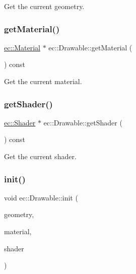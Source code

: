 Get the current geometry. \mbox{\label{classec_1_1_drawable_ac74210aca5428bedbf8af7abe9adbcc1}} 
\subsubsection{\texorpdfstring{get\+Material()}{getMaterial()}}
{\footnotesize\ttfamily \mbox{\hyperlink{classec_1_1_material}{ec\+::\+Material}} $\ast$ ec\+::\+Drawable\+::get\+Material (\begin{DoxyParamCaption}{ }\end{DoxyParamCaption}) const}

Get the current material. \mbox{\label{classec_1_1_drawable_a7de4c8aa937bda1009c6428ceeb541c1}} 
\subsubsection{\texorpdfstring{get\+Shader()}{getShader()}}
{\footnotesize\ttfamily \mbox{\hyperlink{classec_1_1_shader}{ec\+::\+Shader}} $\ast$ ec\+::\+Drawable\+::get\+Shader (\begin{DoxyParamCaption}{ }\end{DoxyParamCaption}) const}

Get the current shader. \mbox{\label{classec_1_1_drawable_ac494c72b1b0396dbe25a822da4e328a9}} 
\subsubsection{\texorpdfstring{init()}{init()}}
{\footnotesize\ttfamily void ec\+::\+Drawable\+::init (\begin{DoxyParamCaption}\item[{\mbox{\hyperlink{classec_1_1_i_geometry_access}{I\+Geometry\+Access}} $\ast$}]{geometry,  }\item[{\mbox{\hyperlink{classec_1_1_material}{Material}} $\ast$}]{material,  }\item[{\mbox{\hyperlink{classec_1_1_shader}{Shader}} $\ast$}]{shader }\end{DoxyParamCaption})}

